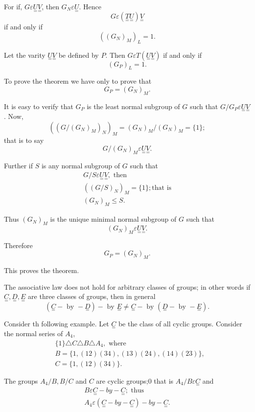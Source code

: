 For if, $G \varepsilon \underset{=}{U} \underset{=}{V}$, then $G_N
\varepsilon \underset{=}{U}$. Hence 
$$
G \varepsilon (\underset{=}{T} \underset{=}{U}) \underset{=}{V}
$$
if and only if 
$$
((G_N)_M)_L = 1.
$$

Let the varity $\underset{=}{U} \underset{=}{V}$ be defined by
$P$. Then $G \varepsilon T(\underset{=}{U} \underset{=}{V})$ if and
only if 
$$
(G_P)_L =1.
$$

To prove the theorem we have only to prove that
$$
G_P = (G_N)_M.
$$

It is easy to verify that $G_P$ is the least normal subgroup of $G$
such that $G/G_P \varepsilon \underset{=}{U} \underset{=}{V}$. Now, 
$$
((G/(G_N)_M)_N)_M = (G_N)_M /(G_N)_M =\{1\};
$$
that is to say 
$$
G/(G_N)_M \varepsilon \underset{=}{U} \underset{=}{V}.
$$

Further if $S$ is any normal subgroup of $G$ such that
\begin{gather*}
  G/S \varepsilon \underset{=}{U} \underset{=}{V}, \text{ then} \\
  ((G/S)_N)_M = \{ 1 \} ; \text {that is}\\
  (G_N)_M \le S.
\end{gather*}

Thus $(G_N)_M$ is the unique minimal normal subgroup of $G$ such that
$$
(G_N)_M \varepsilon \underset{=}{U} \underset{=}{V}.
$$

Therefore
$$
G_P = (G_N)_M.
$$

This proves the theorem.

The associative law does not hold for arbitrary classes of groups; in
other words if $\underset{=}{C}, \underset{=}{D}, \underset{=}{E}$ are
three classes of groups, then in general 
$$
(\underset{=}{C} - \text{ by } -\underset{=}{D}) - \text{ by }
\underset{=}{E} \neq \underset{=}{C} -  \text{ by } (\underset{=}{D} -
\text{ by }-\underset{=}{E}). 
$$

Consider th following example. Let $\underset{=}{C}$ be the class of
all cyclic groups. Consider the normal series of $A_4$, 
\begin{align*}
  & \{1\} \triangle C \triangle B \triangle A_4,  \text{ where}\\
  & B =\{ 1, (12) (34), (13) (24), (14) (23)\},\\
  & C =  \{ 1,(12) (34)\}.
\end{align*}

The groups $A_4 /B, B/C$ and $C$ are cyclic groups;0 that is $A_4/B
\varepsilon \underset{=}{C}$ and 
\begin{gather*}
  B \varepsilon \underset{=}{C} - by -\underset{=}{C} ; \text{ thus}\\
  A_4 \varepsilon (\underset{=}{C} -by- \underset{=}{C}) -by - \underset{=}{C}.
\end{gather*}

